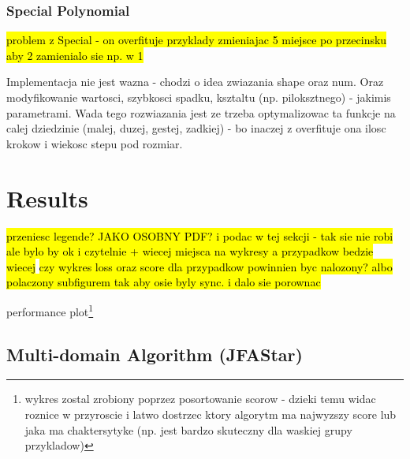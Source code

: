 \documentclass[format=acmsmall,screen,review,authordraft,nonacm]{acmart}
\begin{document}
\subsubsection{Special Polynomial}

\hl{problem z Special - on overfituje przyklady zmieniajac 5 miejsce po
przecinsku aby 2 zamienialo sie np. w 1}

Implementacja nie jest wazna - chodzi o idea zwiazania shape oraz num. Oraz
modyfikowanie wartosci, szybkosci spadku, ksztaltu (np. piloksztnego) - jakimis
parametrami. Wada tego rozwiazania jest ze trzeba optymalizowac ta funkcje na
calej dziedzinie (malej, duzej, gestej, zadkiej) - bo inaczej z overfituje ona
ilosc krokow i wiekosc stepu pod rozmiar.

\section{Results} %

\hl {przeniesc legende? JAKO OSOBNY PDF? i podac w tej sekcji - tak sie nie robi
ale bylo by ok i czytelnie + wiecej miejsca na wykresy a przypadkow bedzie
wiecej}
\hl{czy wykres loss oraz score dla przypadkow powinnien byc nalozony? albo
polaczony subfigurem tak aby osie byly sync. i dalo sie porownac}

performance plot\footnote{wykres zostal zrobiony poprzez posortowanie scorow - dzieki temu widac roznice w
przyroscie i latwo dostrzec ktory algorytm ma najwyzszy score lub jaka ma
chaktersytyke (np. jest bardzo skuteczny dla waskiej grupy przykladow)
}

\subsection{Multi-domain Algorithm (JFAStar)} %
\end{document}
